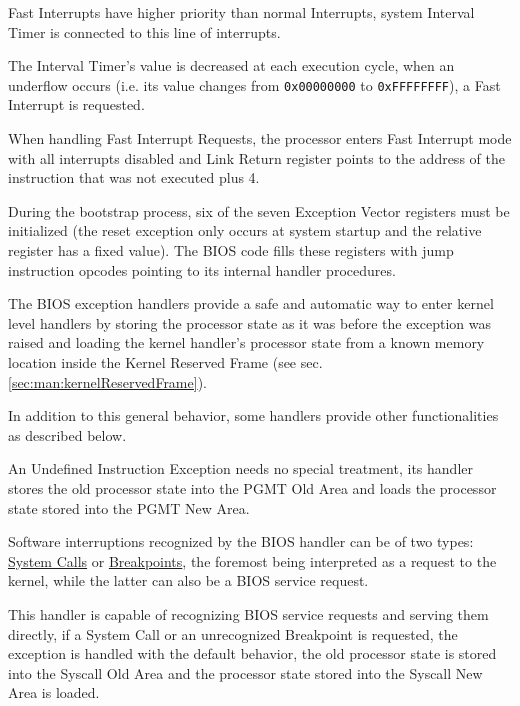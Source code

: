 Fast Interrupts have higher priority than normal Interrupts, system Interval Timer is connected to this line of interrupts. 

The Interval Timer's value is decreased at each execution cycle, when an underflow occurs (i.e. its value changes from \texttt{0x00000000} to \texttt{0xFFFFFFFF}), a Fast Interrupt is requested.

When handling Fast Interrupt Requests, the processor enters Fast Interrupt mode with all interrupts disabled and Link Return register points to the address of the instruction that was not executed plus 4.


During the bootstrap process, six of the seven Exception Vector registers must be initialized (the reset exception only occurs at system startup and the relative register has a fixed value).
The BIOS code fills these registers with jump instruction opcodes pointing to its internal handler procedures.

The BIOS exception handlers provide a safe and automatic way to enter kernel level handlers by storing the processor state as it was before the exception was raised and loading the kernel handler's processor state from a known memory location inside the Kernel Reserved Frame (see sec. \ref{sec:man:kernelReservedFrame}).

In addition to this general behavior, some handlers provide other functionalities as described below.


An Undefined Instruction Exception needs no special treatment, its handler stores the old processor state into the PGMT Old Area and loads the processor state stored into the PGMT New Area.


Software interruptions recognized by the BIOS handler can be of two types: \uline{System Calls} or \uline{Breakpoints}, the foremost being interpreted as a request to the kernel, while the latter can also be a BIOS service request.

This handler is capable of recognizing BIOS service requests and serving them directly, if a System Call or an unrecognized Breakpoint is requested, the exception is handled with the default behavior, the old processor state is stored into the Syscall Old Area and the processor state stored into the Syscall New Area is loaded.


